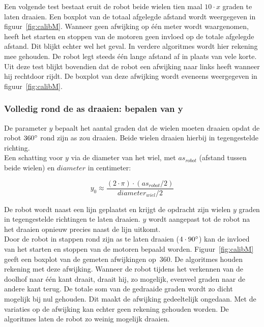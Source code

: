 \documentclass[eind]{penoverslag}
\begin{document}
Een volgende test bestaat eruit de robot beide wielen tien maal $10 \cdot x$ graden te laten draaien. Een boxplot van de totaal afgelegde afstand wordt weergegeven in figuur~\ref{fig:calibM}. Wanneer geen afwijking op \'e\'en meter wordt waargenomen, heeft het starten en stoppen van de motoren geen invloed op de totale afgelegde afstand. Dit blijkt echter wel het geval. In verdere algoritmes wordt hier rekening mee gehouden. De robot legt steeds \'e\'en lange afstand af in plaats van vele korte.\\
Uit deze test blijkt bovendien dat de robot een afwijking naar links heeft wanneer hij rechtdoor rijdt. De boxplot van deze afwijking wordt eveneens weergegeven in figuur~\ref{fig:calibM}.


\subsubsection{Volledig rond de as draaien: bepalen van y} %
\label{ssec:calibMy}
De parameter $y$ bepaalt het aantal graden dat de wielen moeten draaien opdat de robot $360\degree$ rond zijn as zou draaien. Beide wielen draaien hierbij in tegengestelde richting.\\
Een schatting voor $y$ via de diameter van het wiel, met $as_{robot}$ (afstand tussen beide wielen) en $diameter$ in centimeter:

\begin{equation*}
y_{0} \approx \frac{(2 \cdot \pi) \cdot (as_{robot}/2)}{diameter_{wiel}/2}
\end{equation*}

De robot wordt naast een lijn geplaatst en krijgt de opdracht zijn wielen $y$ graden in tegengestelde richtingen te laten draaien. $y$ wordt aangepast tot de robot na het draaien opnieuw precies naast de lijn uitkomt.\\


Door de robot in stappen rond zijn as te laten draaien ($4 \cdot 90\degree$) kan de invloed van het starten en stoppen van de motoren bepaald worden. Figuur~\ref{fig:calibM} geeft een boxplot van de gemeten afwijkingen op~360\degree. De algoritmes houden rekening met deze afwijking. Wanneer de robot tijdens het verkennen van de doolhof naar \'e\'en kant draait, draait hij, zo mogelijk, evenveel graden naar de andere kant terug. De totale som van de gedraaide graden wordt zo dicht mogelijk bij nul gehouden. Dit maakt de afwijking gedeeltelijk ongedaan. Met de variaties op de afwijking kan echter geen rekening gehouden worden. De algoritmes laten de robot zo weinig mogelijk draaien.
\end{document}
